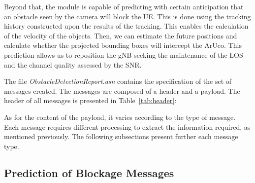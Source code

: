 Beyond that, the module is capable of predicting with certain anticipation that an obstacle seen by the camera will block the UE\@.
This is done using the tracking history constructed upon the results of the tracking.
This enables the calculation of the velocity of the objects.
Then, we can estimate the future positions and calculate whether the projected bounding boxes will intercept the ArUco.
This prediction allows us to reposition the gNB seeking the maintenance of the LOS and the channel quality assessed by the SNR\@.

The file \textit{ObstacleDetectionReport.asn} contains the specification of the set of messages created.
The messages are composed of a header and a payload.
The header of all messages is presented in Table~\ref{tab:header}:


\begin{table}[H]
    \caption{Components of the Message Header}
    \label{tab:header}
    \centering
\end{table}

As for the content of the payload, it varies according to the type of message.
Each message requires different processing to extract the information required, as mentioned previously.
The following subsections present further each message type.

\subsection{Prediction of Blockage Messages}\label{subsec:prediction-of-blockage-messages}

